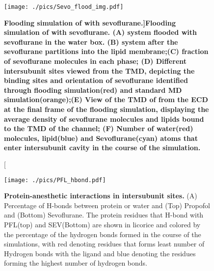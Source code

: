 \documentclass{biophys}
\begin{document}
\begin{figure}
\begin{center}
\centering
\texttt{[image: ./pics/Sevo\_flood\_img.pdf]}
\caption[\bf Flooding simulation of \GABAA with sevoflurane.]{{\bf Flooding simulation of \GABAA with sevoflurane.} (A) \GABAA system flooded with sevoflurane in the water box. (B)  \GABAA system after the sevoflurane partitions into the lipid membrane;(C) fraction of sevoflurane molecules in each phase; (D) Different intersubunit sites viewed from the TMD, depicting the binding sites and orientation of sevoflurane identified through flooding simulation(red) and standard MD simulation(orange);(E) View of the TMD of \GABAA  from the ECD at the final frame of the flooding simulation, displaying the average density of sevoflurane molecules and lipids bound to the TMD of the channel; (F) Number of water(red) molecules, lipid(blue) and Sevoflurane(cyan) atoms that enter intersubunit cavity in the course of the simulation.}
\label{fig:SevFlood}
\end{center}
\end{figure}

\begin{figure}
\begin{center}
\centering
\texttt{[image: ./pics/PFL\_hbond.pdf]}
\caption[bf Protein-anesthetic interactions in intersubunit sites.]{{\bf Protein-anesthetic interactions in intersubunit sites.} (A) Percentage of H-bonds between protein or water and  (Top) Propofol and (Bottom) Sevoflurane. The protein residues that H-bond with PFL(top) and SEV(Bottom) are shown in licorice and colored by the percentage of the hydrogen bonds formed in the course of the simulations, with red denoting residues that forms least number of Hydrogen bonds with the ligand and blue denoting the residues forming the highest number of hydrogen bonds. }
\label{fig:pflSevHbond}
\end{center}
\end{figure}

\end{document}

